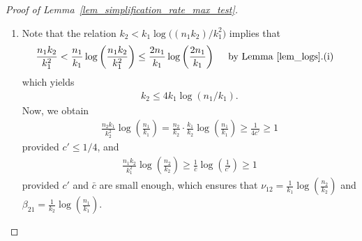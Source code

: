\documentclass{article}
\begin{document}
\begin{proof}[Proof of Lemma~\ref{lem_simplification_rate_max_test}]
\phantom{ }

\begin{enumerate}
    \item 

Note that the relation $k_2 < k_1\log\big((n_1k_2)/k_1^2\big)$ implies that 
\begin{align*}
    \frac{n_1k_2}{k_1^2} &< \frac{n_1}{k_1} \log\left(\frac{n_1k_2}{k_1^2}\right) \leq \frac{2n_1}{k_1} \log\left(\frac{2n_1}{k_1}\right) \quad \text{ by Lemma~\ref{lem_logs}.(i)}
\end{align*}
which yields 
\begin{align}
    k_2 \leq 4 k_1 \log(n_1/k_1). \label{eq_s2<s1_log(d1/s1)}
\end{align}
Now, we obtain 
\begin{align*}
    \frac{n_2k_1}{k_2^2} \log\left(\frac{n_1}{k_1}\right) = \frac{n_2}{k_2} \cdot \frac{k_1}{k_2} \log\left(\frac{n_1}{k_1}\right) \geq \frac{1}{4c'} \geq 1 %
\end{align*}
provided $c' \leq 1/4$, and 
\begin{align*}
    \frac{n_1k_2}{k_1^2} \log\left(\frac{n_2}{k_2}\right) \geq \frac{1}{\bar c} \log\left(\frac{1}{c'}\right) \geq 1 %
\end{align*}
provided $c'$ and $\bar c$ are small enough, which ensures that $\nu_{12 } = \frac{1}{k_1} \log\left(\frac{n_2}{k_2}\right)$ and $\beta_{21} = \frac{1}{k_2} \log\left(\frac{n_1}{k_1}\right)$. 


\end{enumerate}
\end{proof}
\end{document}

